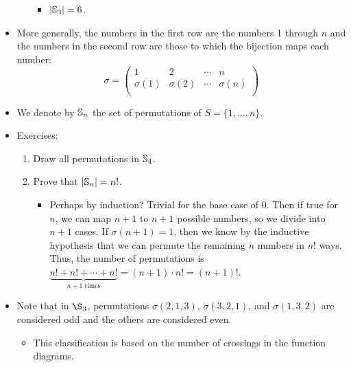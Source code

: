 \documentclass[../main.tex]{subfiles}
\begin{document}
\begin{itemize}
\begin{itemize}
\begin{itemize}
            \item $|\mathbb{S}_3|=6$.
        \end{itemize}
    \end{itemize}
    \item More generally, the numbers in the first row are the numbers 1 through $n$ and the numbers in the second row are those to which the bijection maps each number:
    \begin{equation*}
        \sigma =
        \begin{pmatrix}
            1 & 2 & \cdots & n\\
            \sigma(1) & \sigma(2) & \cdots & \sigma(n)\\
        \end{pmatrix}
    \end{equation*}
    \item We denote by $\mathbb{S}_n$ the set of permutations of $S=\{1,\dots,n\}$.
    \item Exercises:
    \begin{enumerate}
        \item Draw all permutations in $\mathbb{S}_4$.
        \item Prove that $|\mathbb{S}_n|=n!$.
        \begin{itemize}
            \item Perhaps by induction? Trivial for the base case of 0. Then if true for $n$, we can map $n+1$ to $n+1$ possible numbers, so we divide into $n+1$ cases. If $\sigma(n+1)=1$, then we know by the inductive hypothesis that we can permute the remaining $n$ numbers in $n!$ ways. Thus, the number of permutations is $\underbrace{n!+n!+\cdots+n!}_{n+1\text{ times}}=(n+1)\cdot n!=(n+1)!$.
        \end{itemize}
    \end{enumerate}
    \item Note that in $\S_3$, permutations $\sigma(2,1,3)$, $\sigma(3,2,1)$, and $\sigma(1,3,2)$ are considered odd and the others are considered even.
    \begin{itemize}
        \item This classification is based on the number of crossings in the function diagrams.
    \end{itemize}
\end{itemize}
\end{document}
